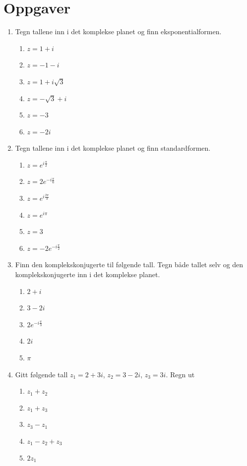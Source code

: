 \documentclass[a4paper,norsk,12pt]{article}
\begin{document}
\section{Oppgaver}
\footnotesize{
\begin{multicols}{2}
\begin{enumerate}
\item
Tegn tallene inn i det komplekse planet og finn eksponentialformen.
\begin{enumerate}[label=\alph*)]
\item
$z = 1 + i$
\item
$z = -1-i$
\item
$z= 1 + i\sqrt{3}$
\item
$z = -\sqrt{3} + i$
\item
$z = -3$
\item
$z = -2i$
\end{enumerate}
\item
Tegn tallene inn i det komplekse planet og finn standardformen.
\begin{enumerate}[label=\alph*)]
\item
$z = e^{i\frac{\pi}{2}}$
\item
$z=2e^{-i\frac{\pi}{6}}$
\item
$z = e^{i\frac{2\pi}{3}}$
\item
$z = e^{i\pi}$
\item
$z = 3$
\item
$z = -2e^{-i\frac{\pi}{2}}$
\end{enumerate}
\item
Finn den komplekskonjugerte til følgende tall. Tegn både tallet selv og den komplekskonjugerte inn i det komplekse planet.
\begin{enumerate}[label=\alph*)]
\item
$2+i$
\item
$3-2i$
\item
$2e^{-i\frac{\pi}{3}}$
\item
$2i$
\item
$\pi$
\end{enumerate}
\item
Gitt følgende tall $z_1 = 2+3i$, $z_2=3-2i$, $z_3 = 3i$. Regn ut
\begin{enumerate}[label=\alph*)]
\item
$z_1+z_2$
\item
$z_1+z_3$
\item
$z_3-z_1$
\item
$z_1-z_2+z_3$
\item
$2z_1$
\end{enumerate}

\end{enumerate}
\end{multicols}}
\end{document}
